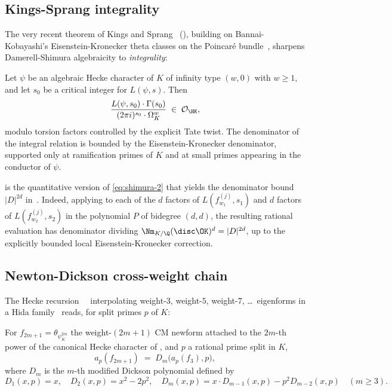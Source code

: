 \subsection{Kings-Sprang integrality}\label{ss:kings-sprang}

The very recent theorem of Kings and Sprang~\cite{KingsSprang2025}
(\cite{KingsSprangArxiv}), building on Bannai-Kobayashi's
Eisenstein-Kronecker theta classes on the Poincar\'e
bundle~\cite{BannaiKobayashi2010}, sharpens
Damerell-Shimura algebraicity to \emph{integrality}:

\begin{theorem}\label{thm:kings-sprang}
Let $\psi$ be an algebraic Hecke character of $K$ of infinity
type $(w, 0)$ with $w \geq 1$, and let $s_0$ be a critical
integer for $L(\psi, s)$. Then
\begin{equation}\label{eq:kings-sprang}
\frac{L(\psi, s_0) \cdot \Gamma(s_0)}{(2\pi i)^{s_0} \cdot \Omega_K^{w}}
\;\in\; \mathcal{O}_{\HK},
\end{equation}
modulo torsion factors controlled by the explicit Tate twist. The
denominator of the integral relation is bounded by the
Eisenstein-Kronecker denominator, supported only at ramification
primes of $K$ and at small primes appearing in the conductor of
$\psi$.
\end{theorem}

 is the quantitative version of
\eqref{eq:shimura-2} that yields the denominator bound
$|D|^{2d}$ in~. Indeed, applying
 to each of the $d$ factors of $L(f_{w_1}^{(j)},
s_1)$ and $d$ factors of $L(f_{w_2}^{(j)}, s_2)$ in the polynomial
$P$ of bidegree $(d, d)$, the resulting rational evaluation has
denominator dividing
$\Nm_{K/\Q}(\disc \OK)^d = |D|^{2d}$, up to the explicitly
bounded local Eisenstein-Kronecker correction.

\subsection{Newton-Dickson cross-weight chain}
\label{ss:newton-dickson}

The Hecke recursion~\cite{Hecke1937}~\cite{Schutt2008}
interpolating weight-$3$, weight-$5$, weight-$7$, \ldots\
eigenforms in a Hida family~\cite{Hida1986} reads, for split
primes $p$ of $K$:

\begin{proposition}[Newton-Dickson chain]\label{prop:newton-dickson}
For $f_{2m+1} = \theta_{\psi_K^{2m}}$ the weight-$(2m+1)$ CM
newform attached to the $2m$-th power of the canonical Hecke
character of , and $p$ a rational prime split in
$K$,
\begin{equation}\label{eq:newton-dickson}
a_p(f_{2m+1}) \;=\; D_m\bigl(a_p(f_3), p\bigr),
\end{equation}
where $D_m$ is the $m$-th modified Dickson polynomial defined by
\[
D_1(x, p) = x, \quad D_2(x, p) = x^2 - 2p^2,
\quad D_m(x, p) = x \cdot D_{m-1}(x, p) - p^2 D_{m-2}(x, p)
\quad (m \geq 3).
\]
\end{proposition}

